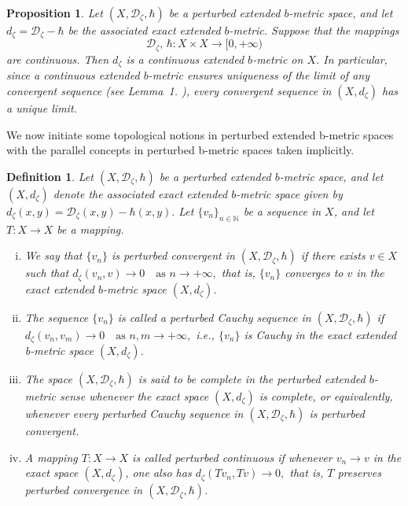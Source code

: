 \documentclass[sn-mathphys-num]{sn-jnl}%
\theoremstyle{thmstyleone}%
\newtheorem{proposition}[theorem]{Proposition}%
\theoremstyle{thmstyletwo}%
\theoremstyle{thmstylethree}%
\newtheorem{definition}{Definition}
\numberwithin{equation}{section}
\begin{document}
\begin{proposition}
Let $(X,\mathcal{D}_{\zeta},\hbar)$ be a perturbed extended $b$-metric space, and
let $d_{\zeta} = \mathcal{D}_{\zeta} - \hbar$
be the associated exact extended $b$-metric. Suppose that the mappings
\[
\mathcal{D}_{\zeta},\, \hbar : X \times X \to [0,+\infty)
\]
are continuous. Then $d_{\zeta}$ is a continuous extended $b$-metric on $X$. 
In particular, since a continuous extended $b$-metric ensures uniqueness of
the limit of any convergent sequence (see Lemma~1. \cite{kamran}), every convergent sequence 
in $(X,d_{\zeta})$ has a unique limit.
\end{proposition}
\vspace{0.3cm}


We now initiate some topological notions in perturbed extended b-metric spaces with the parallel concepts in perturbed b-metric spaces taken implicitly.
\vspace{0.3cm}
\begin{definition}
Let $(X,\mathcal{D}_{\zeta},\hbar)$ be a perturbed extended $b$-metric space, and let 
$(X,d_{\zeta})$ denote the associated exact extended $b$-metric space given by \(
d_{\zeta}(x,y)=\mathcal{D}_{\zeta}(x,y)-\hbar(x,y).
\) Let $\{v_n\}_{n\in\mathbb{N}}$ be a sequence in $X$, and let $T:X\to X$ be a mapping.
\begin{enumerate}[(i)]
\item We say that $\{v_n\}$ is \emph{perturbed convergent in} $(X,\mathcal{D}_{\zeta},\hbar)$ 
if there exists $v\in X$ such that \(d_{\zeta}(v_n,v)\longrightarrow 0 \quad \text{as } n\to+\infty,
\) that is, $\{v_n\}$ converges to $v$ in the exact extended $b$-metric space $(X,d_{\zeta})$.
\item The sequence $\{v_n\}$ is called a \emph{perturbed Cauchy sequence in} 
$(X,\mathcal{D}_{\zeta},\hbar)$ if \(
d_{\zeta}(v_n,v_m)\longrightarrow 0 \quad \text{as } n,m\to+\infty,
\) i.e., $\{v_n\}$ is Cauchy in the exact extended b-metric space $(X,d_{\zeta})$.

\item The space $(X,\mathcal{D}_{\zeta},\hbar)$ is said to be 
\emph{complete in the perturbed extended $b$-metric sense} whenever the exact space 
$(X,d_{\zeta})$ is complete, or equivalently, whenever every perturbed Cauchy sequence 
in $(X,\mathcal{D}_{\zeta},\hbar)$ is perturbed convergent.

\item A mapping $T:X\to X$ is called \emph{perturbed continuous} if 
whenever $v_n \to v$ in the exact space $(X,d_{\zeta})$, one also has \(
d_{\zeta}(Tv_n, Tv)\longrightarrow 0,
\) that is, $T$ preserves perturbed convergence in $(X,\mathcal{D}_{\zeta},\hbar)$.
\end{enumerate}
\end{definition}
\end{document}
